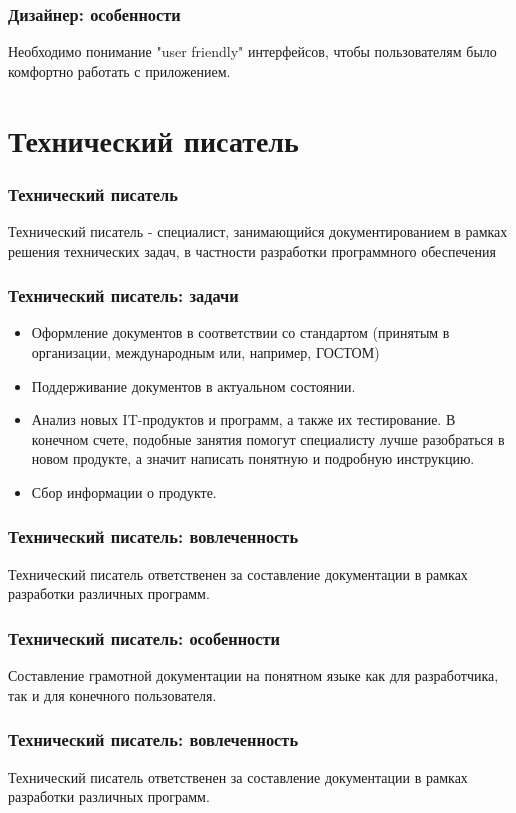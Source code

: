 \documentclass{../industrial-development}
\begin{document}
	\begin{frame} \frametitle{Дизайнер: особенности}
		Необходимо понимание "user friendly" интерфейсов, чтобы пользователям было комфортно работать с приложением.
	\end{frame}
	
	\section{Технический писатель }
	
	\begin{frame} \frametitle{Технический писатель}
		\begin{block}{}
			\alert {Технический писатель} - специалист, занимающийся документированием в рамках решения технических задач, в частности разработки программного обеспечения
		\end{block}
	\end{frame}
	
	\begin{frame} \frametitle{Технический писатель: задачи}
		\begin{itemize}
			\item Оформление документов в соответствии со стандартом (принятым в организации, международным или, например, ГОСТОМ)
			\item Поддерживание документов в актуальном состоянии.
			\item Анализ новых IT-продуктов и программ, а также их тестирование. В конечном счете, подобные занятия помогут специалисту лучше разобраться в новом продукте, а значит написать понятную и подробную инструкцию.
			\item Сбор информации о продукте.
		\end{itemize}
	\end{frame}
	\begin{frame} \frametitle{Технический писатель: вовлеченность}
		Технический писатель ответственен за составление документации в рамках разработки различных программ.
	\end{frame}
	
	\begin{frame} \frametitle{Технический писатель: особенности}
		Составление грамотной документации на понятном языке как для разработчика, так и для конечного пользователя.
	\end{frame}
	\begin{frame} \frametitle{Технический писатель: вовлеченность}
		Технический писатель ответственен за составление документации в рамках разработки различных программ.
	\end{frame}
	
\end{document}
